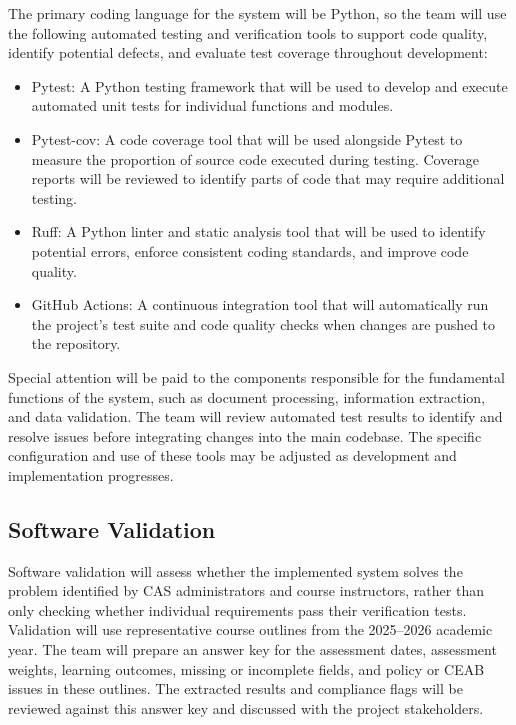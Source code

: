 \documentclass[12pt, titlepage]{article}
\begin{document}



The primary coding language for the system will be Python, so the team will use the following 
automated testing and verification tools to support code quality, identify potential defects, 
and evaluate test coverage throughout development:

\begin{itemize}
  \item Pytest: A Python testing framework that will be used to develop and execute automated unit tests for individual functions and modules.
  \item Pytest-cov: A code coverage tool that will be used alongside Pytest to measure the proportion of source code executed during testing. Coverage reports will be reviewed to identify parts of code that may require additional testing.
  \item Ruff: A Python linter and static analysis tool that will be used to identify potential errors, enforce consistent coding standards, and improve code quality.
  \item GitHub Actions: A continuous integration tool that will automatically run the project's test suite and code quality checks when changes are pushed to the repository.
\end{itemize}

\noindent Special attention will be paid to the components responsible for the fundamental functions of 
the system, such as document processing, information extraction, and data validation. The team 
will review automated test results to identify and resolve issues before integrating changes 
into the main codebase. The specific configuration and use of these tools may be adjusted as 
development and implementation progresses.


\subsection{Software Validation}

Software validation will assess whether the implemented system solves the
problem identified by CAS administrators and course instructors, rather than
only checking whether individual requirements pass their verification tests.
Validation will use representative course outlines from the 2025--2026
academic year. The team
will prepare an answer key for the assessment dates, assessment weights,
learning outcomes, missing or incomplete fields, and policy or CEAB issues in
these outlines. The extracted results and compliance flags will be reviewed
against this answer key and discussed with the project stakeholders.
\end{document}
